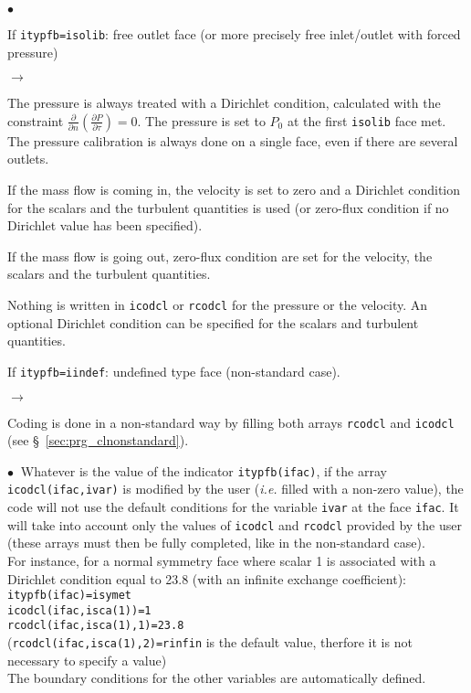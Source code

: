 {{{\begin{list}{$\bullet$}{}
\item If \texttt{itypfb=isolib}: free outlet face (or more precisely free
      inlet/outlet with forced pressure)
\begin{list}{$\rightarrow$}{}
\item The pressure is always treated with a Dirichlet condition, calculated
      with the constraint $\displaystyle \frac{\partial }{\partial n}\left(\frac{ \partial P}{\partial \tau}\right)=0$.
      The pressure is set to $P_0$ at the first \texttt{isolib} face met.
      The pressure calibration is always done on a single face, even if there are
      several outlets.
\item If the mass flow is coming in, the velocity is set to zero
      and a Dirichlet condition for the scalars and the turbulent quantities is used
      (or zero-flux condition if no Dirichlet value has been specified).
\item If the mass flow is going out, zero-flux condition are set for the velocity,
      the scalars and the turbulent quantities.
\item Nothing is written in \texttt{icodcl} or \texttt{rcodcl} for the pressure or
      the velocity. An optional Dirichlet condition can be specified for the scalars
      and turbulent quantities.
\end{list}

\item If \texttt{itypfb=iindef}: undefined type face (non-standard case).
\begin{list}{$\rightarrow$}{}
\item Coding is done in a non-standard way by filling both arrays \texttt{rcodcl} and
      \texttt{icodcl} (see \S~\ref{sec:prg_clnonstandard}).
\end{list}
\end{list}

$\bullet\ $ Whatever is the value of the indicator \texttt{itypfb(ifac)}, if
the array \texttt{icodcl(ifac,ivar)} is modified by the user ({\em i.e.} filled
with a non-zero value), the code will not use the default
conditions for the variable \texttt{ivar} at the face \texttt{ifac}. It will
take into account only the values of \texttt{icodcl} and \texttt{rcodcl} provided by the
user (these arrays must then be fully completed, like in the non-standard case). \\
For instance, for a normal symmetry face where scalar 1 is associated with a
Dirichlet condition equal to 23.8 (with an infinite exchange
coefficient):\\
\hspace*{2cm}\texttt{itypfb(ifac)=isymet}\\
\hspace*{2cm}\texttt{icodcl(ifac,isca(1))=1}\\
\hspace*{2cm}\texttt{rcodcl(ifac,isca(1),1)=23.8}\\
(\texttt{rcodcl(ifac,isca(1),2)=rinfin} is the default value, therfore it is
not necessary to specify a value)\\
The boundary conditions for the other variables are automatically
defined.

}}}
